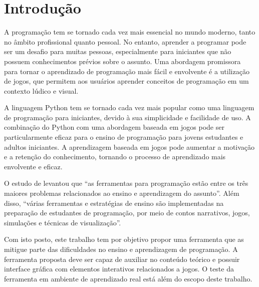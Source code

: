 \chapter[Introdução]{Introdução}

A programação tem se tornado cada vez mais essencial no mundo moderno, tanto no âmbito profissional quanto pessoal. No entanto, aprender a programar pode ser um desafio para muitas pessoas, especialmente para iniciantes que não possuem conhecimentos prévios sobre o assunto. Uma abordagem promissora para tornar o aprendizado de programação mais fácil e envolvente é a utilização de jogos, que permitem aos usuários aprender conceitos de programação em um contexto lúdico e visual.

A linguagem Python tem se tornado cada vez mais popular como uma linguagem de programação para iniciantes, devido à sua simplicidade e facilidade de uso. A combinação do Python com uma abordagem baseada em jogos pode ser particularmente eficaz para o ensino de programação para jovens estudantes e adultos iniciantes. A aprendizagem baseada em jogos pode aumentar a motivação e a retenção do conhecimento, tornando o processo de aprendizado mais envolvente e eficaz.

O estudo de  levantou que ``as ferramentas para programação estão entre os três maiores problemas relacionados ao ensino e aprendizagem do assunto''. Além disso, ``várias ferramentas e estratégias de ensino são implementadas na preparação de estudantes de programação, por meio de contos narrativos, jogos, simulações e técnicas de visualização''.

Com isto posto, este trabalho tem por objetivo propor uma ferramenta que as mitigue parte das dificuldades no ensino e aprendizagem de programação. A ferramenta proposta deve ser capaz de auxiliar no conteúdo teórico e possuir interface gráfica com elementos interativos relacionados a jogos. O teste da ferramenta em ambiente de aprendizado real está além do escopo deste trabalho.
